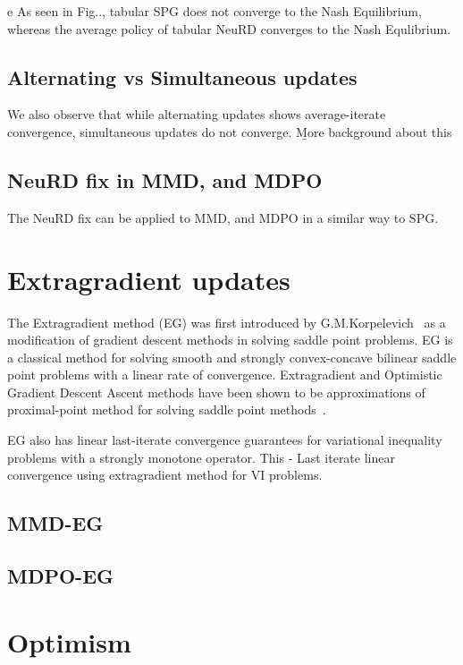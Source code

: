 e As seen in Fig.., tabular SPG does not converge to the Nash Equilibrium, 
whereas the average policy of tabular NeuRD converges to the Nash Equlibrium.

\subsection{Alternating vs Simultaneous updates}

We also observe that while alternating updates shows average-iterate convergence, simultaneous updates do not converge.
\b{More background about this}

\subsection{NeuRD fix in MMD, and MDPO}
The NeuRD fix can be applied to MMD, and MDPO in a similar way to SPG.


\section{Extragradient updates}

The Extragradient method (EG) was first introduced by
G.M.Korpelevich~\cite{korpelevichextragradient1976} as a modification of gradient descent methods
in solving saddle point problems.
EG is a classical method for solving smooth and strongly convex-concave bilinear saddle
point problems with a linear rate of convergence.
Extragradient and Optimistic Gradient Descent Ascent methods have been shown to be approximations
of proximal-point method for solving saddle point methods~\cite{mokhtariUnified2020}.

EG also has linear last-iterate convergence guarantees for variational inequality problems with a 
strongly monotone operator. This 
\cite{tsenglinear1995} - Last iterate linear convergence using extragradient method for VI problems.

\subsection{MMD-EG}

\subsection{MDPO-EG}

\section{Optimism}

